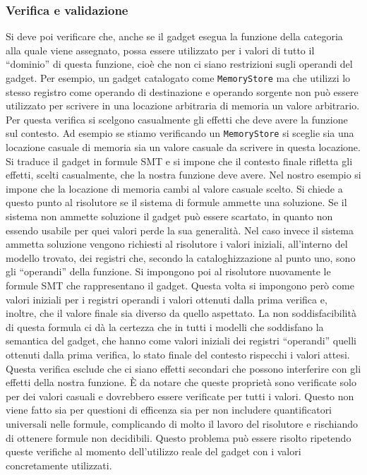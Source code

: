 \subsubsection{Verifica e validazione}
Si deve poi verificare che, anche se il gadget esegua la funzione
della categoria alla quale viene assegnato, possa essere utilizzato
per i valori di tutto il ``dominio'' di questa funzione, cioè che non
ci siano restrizioni sugli operandi del gadget. Per esempio, un gadget
catalogato come \lstinline{MemoryStore} ma che utilizzi lo stesso
registro come operando di destinazione e operando sorgente non può
essere utilizzato per scrivere in una locazione arbitraria di memoria
un valore arbitrario. Per questa verifica si scelgono casualmente gli
effetti che deve avere la funzione sul contesto. Ad esempio se stiamo
verificando un \lstinline{MemoryStore} si sceglie sia una locazione
casuale di memoria sia un valore casuale da scrivere in questa
locazione. Si traduce il gadget in formule SMT e si impone che il
contesto finale rifletta gli effetti, scelti casualmente, che la
nostra funzione deve avere. Nel nostro esempio si impone che la
locazione di memoria cambi al valore casuale scelto. Si chiede a
questo punto al risolutore se il sistema di formule ammette una
soluzione. Se il sistema non ammette soluzione il gadget può essere
scartato, in quanto non essendo usabile per quei valori perde la sua
generalità. Nel caso invece il sistema ammetta soluzione vengono
richiesti al risolutore i valori iniziali, all'interno del modello
trovato, dei registri che, secondo la cataloghizzazione al punto uno,
sono gli ``operandi'' della funzione. Si impongono poi al risolutore
nuovamente le formule SMT che rappresentano il gadget.  Questa volta
si impongono però come valori iniziali per i registri operandi i
valori ottenuti dalla prima verifica e, inoltre, che il valore finale
sia diverso da quello aspettato. La non soddisfacibilità di questa
formula ci dà la certezza che in tutti i modelli che soddisfano la
semantica del gadget, che hanno come valori iniziali dei registri
``operandi'' quelli ottenuti dalla prima verifica, lo stato finale del
contesto rispecchi i valori attesi. Questa verifica esclude che ci
siano effetti secondari che possono interferire con gli effetti della
nostra funzione. È da notare che queste proprietà sono verificate solo
per dei valori casuali e dovrebbero essere verificate per tutti i
valori. Questo non viene fatto sia per questioni di efficenza sia per
non includere quantificatori universali nelle formule, complicando di
molto il lavoro del risolutore e rischiando di ottenere formule non
decidibili. Questo problema può essere risolto ripetendo queste
verifiche al momento dell'utilizzo reale del gadget con i valori
concretamente utilizzati.

